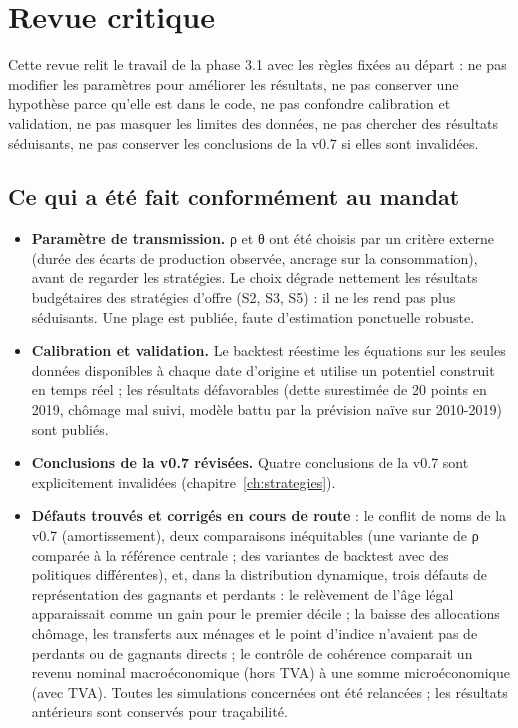 \chapter{Revue critique}\label{ch:revue}

Cette revue relit le travail de la phase 3.1 avec les règles fixées au départ : ne pas modifier les paramètres pour
améliorer les résultats, ne pas conserver une hypothèse parce qu'elle est dans le code, ne pas confondre calibration et
validation, ne pas masquer les limites des données, ne pas chercher des résultats séduisants, ne pas conserver les
conclusions de la v0.7 si elles sont invalidées.

\section{Ce qui a été fait conformément au mandat}

\begin{itemize}
\item \textbf{Paramètre de transmission.} ρ et θ ont été choisis par un critère externe (durée des écarts de production
observée, ancrage sur la consommation), avant de regarder les stratégies. Le choix dégrade nettement les résultats
budgétaires des stratégies d'offre (S2, S3, S5) : il ne les rend pas plus séduisants. Une plage est publiée, faute
d'estimation ponctuelle robuste.
\item \textbf{Calibration et validation.} Le backtest réestime les équations sur les seules données disponibles à
chaque date d'origine et utilise un potentiel construit en temps réel ; les résultats défavorables (dette surestimée de
20 points en 2019, chômage mal suivi, modèle battu par la prévision naïve sur 2010-2019) sont publiés.
\item \textbf{Conclusions de la v0.7 révisées.} Quatre conclusions de la v0.7 sont explicitement invalidées
(chapitre~\ref{ch:strategies}).
\item \textbf{Défauts trouvés et corrigés en cours de route} : le conflit de noms de la v0.7 (amortissement), deux
comparaisons inéquitables (une variante de ρ comparée à la référence centrale ; des variantes de backtest avec des
politiques différentes), et, dans la distribution dynamique, trois défauts de représentation des gagnants et perdants :
le relèvement de l'âge légal apparaissait comme un gain pour le premier décile ; la baisse des allocations chômage,
les transferts aux ménages et le point d'indice n'avaient pas de perdants ou de gagnants directs ; le contrôle de
cohérence comparait un revenu nominal macroéconomique (hors TVA) à une somme microéconomique (avec TVA). Toutes les
simulations concernées ont été relancées ; les résultats antérieurs sont conservés pour traçabilité.
\end{itemize}

